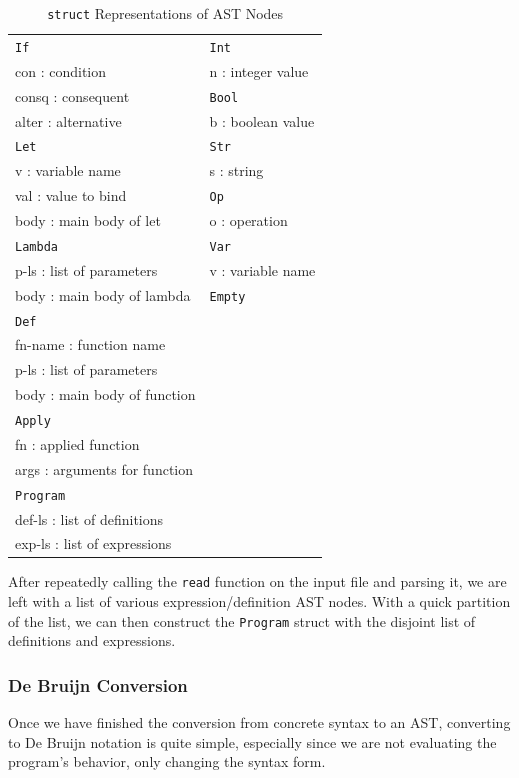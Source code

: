 \documentclass[12pt]{article}
\newcommand{\tab}{\hspace{6mm}}
\newcommand{\key}[1]{\texttt{#1}}
\begin{document}
\begin{table}[H]
  \begin{mdframed}
    \centering
    \begin{tabular}{ll}
      \key{If} & \key{Int} \\
      \tab con : condition & \tab n : integer value \\
      \tab consq : consequent & \key{Bool} \\
      \tab alter : alternative & \tab b : boolean value \\
      \key{Let} & \key{Str} \\
      \tab v : variable name & \tab s : string \\
      \tab val : value to bind & \key{Op} \\
      \tab body : main body of let & \tab o : operation \\
      \key{Lambda} & \key{Var} \\
      \tab p-ls : list of parameters & \tab v : variable name \\
      \tab body : main body of lambda & \key{Empty} \\
      \key{Def} \\
      \tab fn-name : function name \\
      \tab p-ls : list of parameters \\
      \tab body : main body of function \\
      \key{Apply} \\
      \tab fn : applied function \\
      \tab args : arguments for function \\
      \key{Program} \\
      \tab def-ls : list of definitions \\
      \tab exp-ls : list of expressions
    \end{tabular}
  \end{mdframed}
  \caption{\key{struct} Representations of AST Nodes}
  \label{ast-structs}
\end{table}

After repeatedly calling the \key{read} function on the input file and parsing it, we are left with a list of various expression/definition AST nodes. With a quick partition of the list, we can then construct the \key{Program} struct with the disjoint list of definitions and expressions.

\subsubsection{De Bruijn Conversion}
Once we have finished the conversion from concrete syntax to an AST, converting to De Bruijn notation is quite simple, especially since we are not evaluating the program's behavior, only changing the syntax form.
\end{document}
